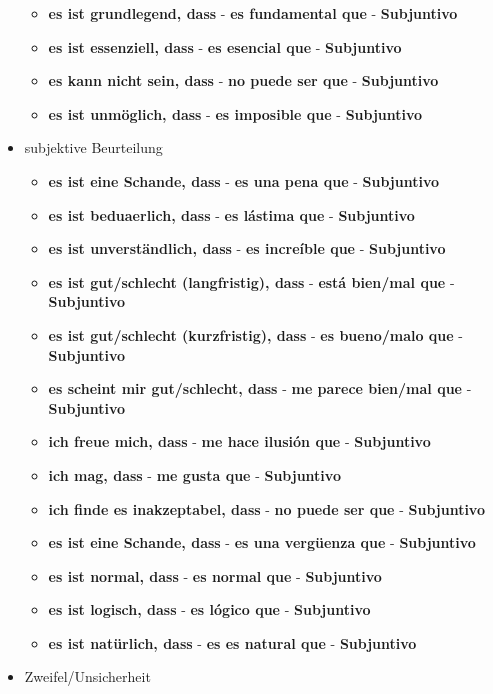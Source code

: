 \documentclass{article}
\begin{document}
\begin{multicols}{2}
\begin{itemize}
\begin{itemize}
			\item{\textbf{es ist grundlegend, dass} - \textbf{es fundamental que} - \textbf{Subjuntivo}}
			\item{\textbf{es ist essenziell, dass} - \textbf{es esencial que} - \textbf{Subjuntivo}}
			\item{\textbf{es kann nicht sein, dass} - \textbf{no puede ser que} - \textbf{Subjuntivo}}
			\item{\textbf{es ist unmöglich, dass} - \textbf{es imposible que} - \textbf{Subjuntivo}}
		\end{itemize}
		\item{subjektive Beurteilung}
		\begin{itemize}
			\item{\textbf{es ist eine Schande, dass} - \textbf{es una pena que} - \textbf{Subjuntivo}}
			\item{\textbf{es ist beduaerlich, dass} - \textbf{es lástima que} - \textbf{Subjuntivo}}
			\item{\textbf{es ist unverständlich, dass} - \textbf{es increíble que} - \textbf{Subjuntivo}}
			\item{\textbf{es ist gut/schlecht (langfristig), dass} - \textbf{está bien/mal que} - \textbf{Subjuntivo}}
			\item{\textbf{es ist gut/schlecht (kurzfristig), dass} - \textbf{es bueno/malo que} - \textbf{Subjuntivo}}
			\item{\textbf{es scheint mir gut/schlecht, dass} - \textbf{me parece bien/mal que} - \textbf{Subjuntivo}}
			\item{\textbf{ich freue mich, dass} - \textbf{me hace ilusión que} - \textbf{Subjuntivo}}
			\item{\textbf{ich mag, dass} - \textbf{me gusta que} - \textbf{Subjuntivo}}
			\item{\textbf{ich finde es inakzeptabel, dass} - \textbf{no puede ser que} - \textbf{Subjuntivo}}
			\item{\textbf{es ist eine Schande, dass} - \textbf{es una vergüenza que} - \textbf{Subjuntivo}}
			\item{\textbf{es ist normal, dass} - \textbf{es normal que} - \textbf{Subjuntivo}}
			\item{\textbf{es ist logisch, dass} - \textbf{es lógico que} - \textbf{Subjuntivo}}
			\item{\textbf{es ist natürlich, dass} - \textbf{es es natural que} - \textbf{Subjuntivo}}
		\end{itemize}
		\item{Zweifel/Unsicherheit}

\end{itemize}
\end{multicols}
\end{document}
